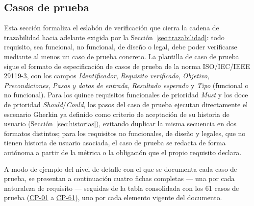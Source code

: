\documentclass[journal,onecolumn]{IEEEtran}
\begin{document}
	\subsection{Casos de prueba}
	\label{sec:casos-prueba}

	Esta sección formaliza el eslabón de verificación que cierra la cadena de
	trazabilidad hacia adelante exigida por la Sección~\ref{sec:trazabilidad}:
	todo requisito, sea funcional, no funcional, de diseño o legal, debe poder
	verificarse mediante al menos un caso de prueba concreto. La plantilla de
	caso de prueba sigue el formato de especificación de casos de prueba de la
	norma ISO/IEC/IEEE 29119-3, con los campos \emph{Identificador},
	\emph{Requisito verificado}, \emph{Objetivo}, \emph{Precondiciones},
	\emph{Pasos y datos de entrada}, \emph{Resultado esperado} y \emph{Tipo}
	(funcional o no funcional). Para los quince requisitos funcionales de
	prioridad \emph{Must} y los doce de prioridad \emph{Should}/\emph{Could},
	los pasos del caso de prueba ejecutan directamente el escenario Gherkin ya
	definido como criterio de aceptación de su historia de usuario
	(Sección~\ref{sec:historias}), evitando duplicar la misma secuencia en dos
	formatos distintos; para los requisitos no funcionales, de diseño y
	legales, que no tienen historia de usuario asociada, el caso de prueba se
	redacta de forma autónoma a partir de la métrica o la obligación que el
	propio requisito declara.

	A modo de ejemplo del nivel de detalle con el que se documenta cada caso
	de prueba, se presentan a continuación cuatro fichas completas
	--- una por cada naturaleza de requisito --- seguidas de la tabla
	consolidada con los 61 casos de prueba (\hyperref[tab:CP-01]{CP-01} a \hyperref[cp:61]{CP-61}), uno por cada
	elemento vigente del documento.
\end{document}
